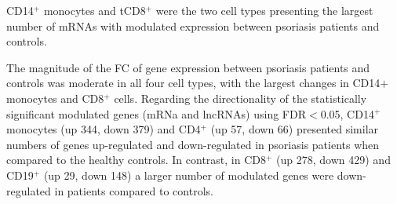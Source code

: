 CD14$^+$ monocytes and tCD8$^+$ were the two cell types presenting the largest number of mRNAs with modulated expression between psoriasis patients and controls. %

The magnitude of the FC of gene expression between psoriasis patients and controls was moderate in all four cell types, with the largest changes in CD14$+$ monocytes and CD8$^+$ cells. Regarding the directionality of the statistically significant modulated genes (mRNa and lncRNAs) using FDR$<$0.05, CD14$^+$ monocytes (up 344, down 379) and CD4$^+$ (up 57, down 66) presented similar numbers of genes up-regulated and down-regulated in psoriasis patients when compared to the healthy controls. In contrast, in CD8$^+$ (up 278, down 429) and CD19$^+$ (up 29, down 148) a larger number of modulated genes were down-regulated in patients compared to controls.



